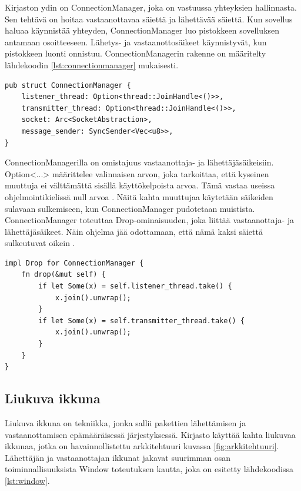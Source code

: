 \documentclass[a4paper,12pt]{article}
\begin{document}
    Kirjaston ydin on ConnectionManager, joka on vastuussa yhteyksien hallinnasta. Sen tehtävä on
    hoitaa vastaanottavaa säiettä ja lähettävää säiettä. Kun sovellus haluaa käynnistää yhteyden,
    ConnectionManager luo pistokkeen sovelluksen antamaan osoitteeseen.
    Lähetys- ja vastaanottosäikeet käynnistyvät, kun pistokkeen luonti onnistuu. ConnectionManagerin rakenne on määritelty lähdekoodin \ref{lst:connectionmanager} mukaisesti.
    
    \begin{lstlisting}[caption={ConnectionManagerin rakenne}, label={lst:connectionmanager}]
pub struct ConnectionManager {
    listener_thread: Option<thread::JoinHandle<()>>,
    transmitter_thread: Option<thread::JoinHandle<()>>,
    socket: Arc<SocketAbstraction>,
    message_sender: SyncSender<Vec<u8>>,
}\end{lstlisting}

    

    ConnectionManagerilla on omistajuus vastaanottaja- ja lähettäjäsäikeisiin.
    Option<...> määrittelee valinnaisen arvon, joka tarkoittaa, että kyseinen muuttuja ei
    välttämättä sisällä käyttökelpoista arvoa. Tämä vastaa useissa ohjelmointikielissä null arvoa \cite[luku 6.1]{rust-book}. Näitä kahta muuttujaa käytetään säikeiden sulavaan sulkemiseen, kun ConnectionManager pudotetaan muistista. ConnectionManager toteuttaa Drop-ominaisuuden, joka liittää vastaanottaja-
    ja lähettäjäsäikeet. Näin ohjelma jää odottamaan, että nämä kaksi säiettä sulkeutuvat oikein \cite[\textit{JoinHandle}]{rust-std}.
    
    \architecture
    

    \begin{lstlisting}[caption={Drop-ominaisuuden toteutus ConnectionManagerille}, label={lst:connectionmanager_drop}]
impl Drop for ConnectionManager {
    fn drop(&mut self) {
        if let Some(x) = self.listener_thread.take() {
            x.join().unwrap();
        }
        if let Some(x) = self.transmitter_thread.take() {
            x.join().unwrap();
        }
    }
}\end{lstlisting}



    \subsection{Liukuva ikkuna}\label{sec:liukuva_ikkuna}
    Liukuva ikkuna on tekniikka, jonka sallii pakettien lähettämisen ja vastaanottamisen epämääräisessä järjestyksessä. 
    Kirjasto käyttää kahta liukuvaa ikkunaa, jotka on havainnollistettu arkkitehtuuri kuvassa \ref{fig:arkkitehtuuri}. Lähettäjän ja vastaanottajan ikkunat jakavat suurimman osan toiminnallisuuksista Window toteutuksen kautta, joka on esitetty lähdekoodissa \ref{lst:window}. 
\end{document}
